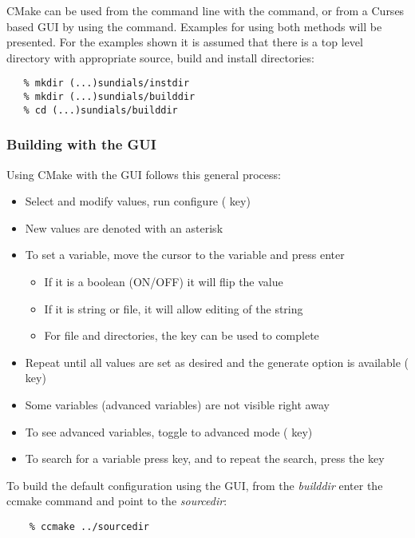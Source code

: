 CMake can be used from the command line with the  command, or from a Curses based GUI
by using the  command. Examples for using both methods will be presented.
For the examples shown it is assumed that there is a top level {\sundials} directory
with appropriate source, build and install directories:

\begin{verbatim}
   % mkdir (...)sundials/instdir
   % mkdir (...)sundials/builddir
   % cd (...)sundials/builddir
\end{verbatim}

\subsubsection*{Building with the GUI}

Using CMake with the GUI follows this general process:  
\begin{itemize}
\item Select and modify values, run configure ( key)
\item New values are denoted with an asterisk
\item To set a variable, move the cursor to the variable and press enter
  \begin{itemize}
  \item If it is a boolean (ON/OFF) it will flip the value
  \item If it is string or file, it will allow editing of the string
  \item For file and directories, the  key can be used to complete 
  \end{itemize}
\item Repeat until all values are set as desired and the generate option is available ( key)
\item Some variables (advanced variables) are not visible right away
\item To see advanced variables, toggle to advanced mode ( key)
\item To search for a variable press \id{/} key, and to repeat the search, press the
 key
\end{itemize}

To build the default configuration using the GUI, from the {\em builddir} enter
the ccmake command and point to the {\em sourcedir}:

\begin{verbatim}
    % ccmake ../sourcedir
\end{verbatim}

